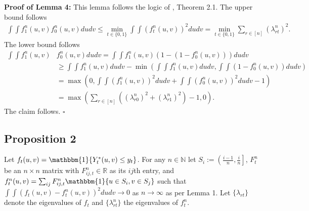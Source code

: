 \documentclass[12pt]{article}
\theoremstyle{definition}
\begin{document}
\begin{flushleft}
\textbf{Proof of Lemma 4:} This lemma follows the logic of \cite{whitt1976bivariate}, Theorem 2.1. The upper bound follows  
\begin{align*}
\int\int f^{n}_{1}(u,v)f^{n}_{0}(u,v)dudv 
\leq \min_{t \in \{0,1\}}\int\int (f^{n}_{t}(u,v))^{2}dudv 
= \min_{t \in \{0,1\}}\sum_{r \in [n]}(\lambda_{rt}^{n})^{2}.
\end{align*}
The lower bound follows
 \begin{align*}
 \int\int f^{n}_{1}(u,v)&f^{n}_{0}(u,v)dudv 
 = \int\int f^{n}_{1}(u,v)\left( 1 - \left(1 - f^{n}_{0}(u,v)\right)\right)dudv \\
 &\geq \int\int f^{n}_{1}(u,v)dudv - \min \left(\int\int f^{n}_{1}(u,v)dudv , \int\int\left(1 - f^{n}_{0}(u,v)\right)dudv\right)\\
  &= \max\left(0,\int\int (f^{n}_{1}(u,v))^{2}dudv + \int\int (f^{n}_{0}(u,v))^{2}dudv - 1\right) \\
 &= \max\left(\sum_{r \in [n]}\left((\lambda_{r0}^{n})^{2}+(\lambda_{r1}^{n})^{2}\right) - 1,0\right). 
 \end{align*}
 The claim follows. $\square$
\end{flushleft}


\subsection{Proposition 2}
Let $f_{t}(u,v) = \mathbbm{1}\{Y_{t}^{*}(u,v) \leq y_{t}\}$. For any $n\in \mathbb{N}$ let $S_{i} := \left(\frac{i-1}{n},\frac{i}{n}\right]$, $F_{t}^{n}$ be an $n\times n$ matrix with $F_{ij,t}^{n} \in \mathbb{R}$ as its $ij$th entry, and $f_{t}^{n}(u,v) = \sum_{ij}F_{ij,t}^{n}\mathbbm{1}\{u \in S_{i}, v \in S_{j}\}$ such that $\int\int\left(f_{t}(u,v)-f_{t}^{n}(u,v)\right)^{2}dudv \to 0$ as $n\to\infty$ as per Lemma 1. Let $\{\lambda_{rt}\}$ denote the eigenvalues of  $f_{t}$ and $\{\lambda^{n}_{rt}\}$ the eigenvalues of  $f_{t}^{n}$. \newline
\end{document}
